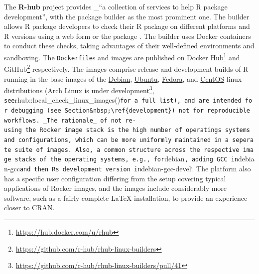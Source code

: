 \label{rhub} The \textbf{R-hub} project provides \_``a collection of
services to help R package development'', with the package builder as
the most prominent one\citep{r-hub_docs_2019}. The builder allows R
package developers to check their R package on different platforms and R
versions using a web form or the package 
\citep{csardi_rhub_2019}. The builder uses Docker containers to conduct
these checks, taking advantages of their well-defined environments and
sandboxing. The \texttt{Dockerfile}s and images are published on Docker
Hub\footnote{\href{https://hub.docker.com/u/rhub}{https://hub.docker.com/u/rhub}}
and
GitHub\footnote{\href{https://github.com/r-hub/rhub-linux-builders}{https://github.com/r-hub/rhub-linux-builders}}
respectively. The images comprise release and development builds of R
running in the base images of the
\href{https://www.debian.org/}{Debian},
\href{https://ubuntu.com/}{Ubuntu},
\href{https://getfedora.org/}{Fedora}, and
\href{https://centos.org/}{CentOS} linux distributions (Arch Linux is
under
development\footnote{\href{https://github.com/r-hub/rhub-linux-builders/pull/41}{https://github.com/r-hub/rhub-linux-builders/pull/41}},
\texttt{see}rhub::local\_check\_linux\_images()\texttt{for\ a\ full\ list),\ and\ are\ intended\ for\ debugging\ (see\ Section\&nbsp;\textbackslash{}ref\{development\})\ not\ for\ reproducible\ workflows.\ \_The\ rationale\_\ of\ not\ re-using\ the\ Rocker\ image\ stack\ is\ the\ high\ number\ of\ operatings\ systems\ and\ configurations,\ which\ can\ be\ more\ uniformly\ maintained\ in\ a\ seperate\ suite\ of\ images.\ Also,\ a\ common\ structure\ across\ the\ respective\ image\ stacks\ of\ the\ operating\ systems,\ e.g.,\ for}debian\texttt{,\ adding\ GCC\ in}debian-gcc\texttt{and\ then\ R\textquotesingle{}s\ development\ version\ in}debian-gcc-devel`.
The platform also has a specific user configuration differing from the
setup covering typical applications of Rocker images, and the images
include considerably more software, such as a fairly complete LaTeX
installation, to provide an experience closer to CRAN.

